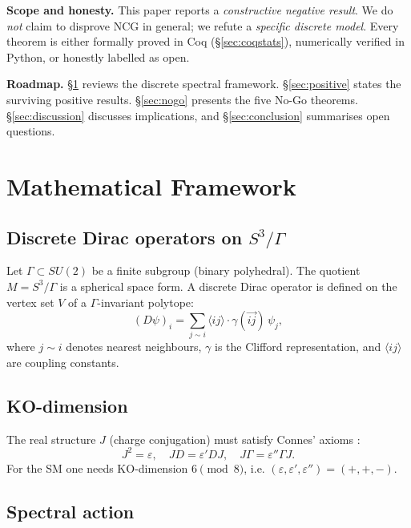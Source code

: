 \documentclass[11pt,a4paper]{article}
\theoremstyle{definition}
\begin{document}
\textbf{Scope and honesty.} This paper reports a \emph{constructive negative
result}. We do \emph{not} claim to disprove NCG in general; we refute a
\emph{specific discrete model}. Every theorem is either formally proved in
Coq (\S\ref{sec:coqstats}), numerically verified in Python, or honestly
labelled as open.

\textbf{Roadmap.} \S\ref{sec:framework} reviews the discrete spectral
framework. \S\ref{sec:positive} states the surviving positive results.
\S\ref{sec:nogo} presents the five No-Go theorems. \S\ref{sec:discussion}
discusses implications, and \S\ref{sec:conclusion} summarises open questions.

\section{Mathematical Framework}\label{sec:framework}

\subsection{Discrete Dirac operators on $S^3/\Gamma$}

Let $\Gamma \subset SU(2)$ be a finite subgroup (binary polyhedral). The
quotient $M = S^3/\Gamma$ is a spherical space form. A discrete Dirac
operator is defined on the vertex set $V$ of a $\Gamma$-invariant polytope:
\begin{equation}\label{eq:dirac}
  (D\psi)_i = \sum_{j \sim i} \langle i j \rangle \cdot \gamma(\overrightarrow{ij}) \, \psi_j,
\end{equation}
where $j \sim i$ denotes nearest neighbours, $\gamma$ is the Clifford
representation, and $\langle i j \rangle$ are coupling constants.

\subsection{KO-dimension}

The real structure $J$ (charge conjugation) must satisfy Connes' axioms
\cite{Connes:1996}:
\begin{equation}
  J^2 = \varepsilon, \quad JD = \varepsilon' DJ, \quad J\Gamma = \varepsilon'' \Gamma J.
\end{equation}
For the SM one needs KO-dimension $6 \pmod 8$, i.e.
$(\varepsilon, \varepsilon', \varepsilon'') = (+, +, -)$.

\subsection{Spectral action}
\end{document}
